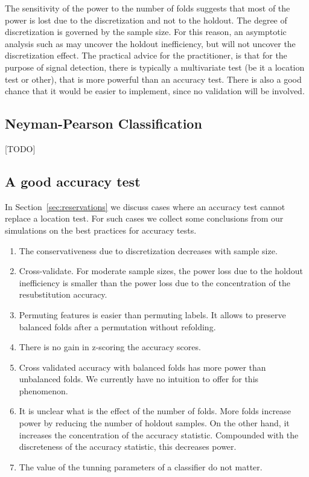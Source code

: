 \documentclass[12pt,a4paper]{article}
\begin{document}
The sensitivity of the power to the number of folds suggests that most of the power is lost due to the discretization and not to the holdout. 
The degree of discretization is governed by the sample size. 
For this reason, an asymptotic analysis such as \cite{ramdas_classification_2016} may uncover the holdout inefficiency, but will not uncover the discretization effect. 
The practical advice for the practitioner, is that for the purpose of signal detection, there is typically a multivariate test (be it a location test or other), that is more powerful than an accuracy test. 
There is also a good chance that it would be easier to implement, since no validation will be involved. 


\subsection{Neyman-Pearson Classification}
[TODO]



\subsection{A good accuracy test}
In Section~\ref{sec:reservations} we discuss cases where an accuracy test cannot replace a location test.
For such cases we collect some conclusions from our simulations on the best practices for accuracy tests.
\begin{enumerate}
\item The conservativeness due to discretization decreases with sample size. 
\item Cross-validate. For moderate sample sizes, the power loss due to the holdout inefficiency is smaller than the power loss due to the concentration of the resubstitution accuracy. 
\item Permuting features is easier than permuting labels. It allows to preserve balanced folds after a permutation without refolding. 
\item There is no gain in z-scoring the accuracy scores. 
\item Cross validated accuracy with balanced folds has more power than unbalanced folds. We currently have no intuition to offer for this phenomenon.
\item It is unclear what is the effect of the number of folds. More folds increase power by reducing the number of holdout samples. On the other hand, it increases the concentration of the accuracy statistic. Compounded with the discreteness of the accuracy statistic, this decreases power. 
\item The value of the tunning parameters of a classifier do not matter. 
\end{enumerate}
\end{document}
